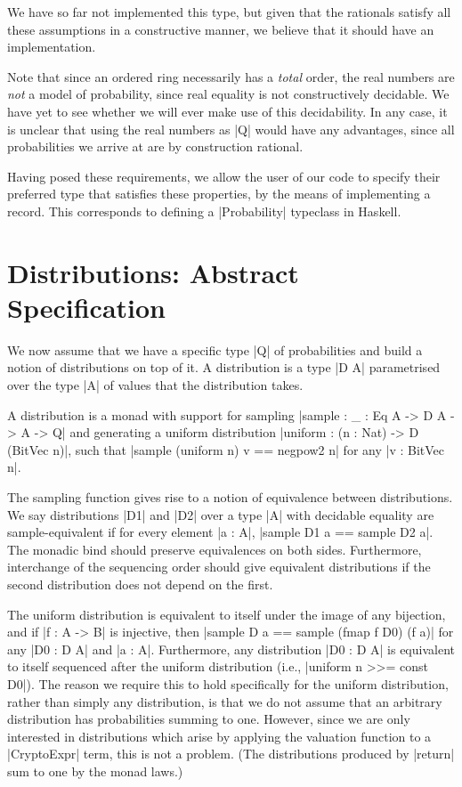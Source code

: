 We have so far not implemented this type, but given that the rationals satisfy all these assumptions in a constructive
manner, we believe that it should have an implementation.

Note that since an ordered ring necessarily has a \emph{total} order, the real numbers are \emph{not} a model of
probability, since real equality is not constructively decidable.  We have yet to see whether we will ever make use of
this decidability.  In any case, it is unclear that using the real numbers as |Q| would have any advantages, since all
probabilities we arrive at are by construction rational.

Having posed these requirements, we allow the user of our code to specify their preferred type that satisfies these
properties, by the means of implementing a record.  This corresponds to defining a |Probability| typeclass in Haskell.

\section{Distributions: Abstract Specification}

We now assume that we have a specific type |Q| of probabilities and build a notion of distributions on top of it.
A distribution is a type |D A| parametrised over the type |A| of values that the distribution takes.

A distribution is a monad with support for sampling |sample : {{_ : Eq A}} -> D A -> A -> Q| and generating a uniform
distribution |uniform : (n : Nat) -> D (BitVec n)|, such that |sample (uniform n) v == negpow2 n| for any |v : BitVec
n|.

The sampling function gives rise to a notion of equivalence between distributions.  We say distributions |D1| and |D2|
over a type |A| with decidable equality are sample-equivalent if for every element |a : A|, |sample D1 a == sample
D2 a|.  The monadic bind should preserve equivalences on both sides.  Furthermore, interchange of the sequencing order
should give equivalent distributions if the second distribution does not depend on the first.

The uniform distribution is equivalent to itself under the image of any bijection, and if |f : A -> B| is injective,
then |sample D a == sample (fmap f D0) (f a)| for any |D0 : D A| and |a : A|.  Furthermore, any distribution |D0 : D A|
is equivalent to itself sequenced after the uniform distribution (i.e., |uniform n >>= const D0|).  The reason we
require this to hold specifically for the uniform distribution, rather than simply any distribution, is that we do not
assume that an arbitrary distribution has probabilities summing to one.  However, since we are only interested in
distributions which arise by applying the valuation function to a |CryptoExpr| term, this is not a problem.  (The
distributions produced by |return| sum to one by the monad laws.)

